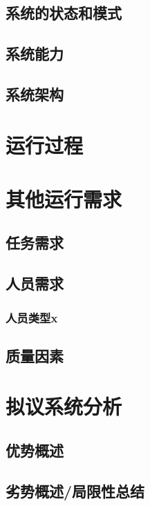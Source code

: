 \documentclass{ctexart}
\begin{document}
\subsection{系统的状态和模式}

\subsection{系统能力}

\subsection{系统架构}

\newpage
\section{运行过程}

\newpage
\section{其他运行需求}

\subsection{任务需求}

\subsection{人员需求}

\subsubsection{人员类型x}

\subsection{质量因素}

\newpage
\section{拟议系统分析}

\subsection{优势概述}

\subsection{劣势概述/局限性总结}
\end{document}
